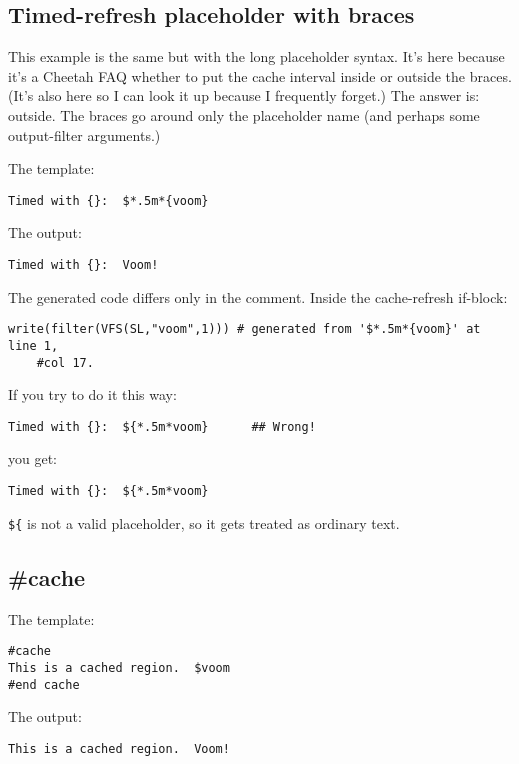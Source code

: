 \subsection{Timed-refresh placeholder with braces}
\label{cache.timed.braces}

This example is the same but with the long placeholder syntax.  It's here 
because it's a Cheetah FAQ whether to put the cache interval inside or outside
the braces.  (It's also here so I can look it up because I frequently forget.)
The answer is: outside.  The braces go around only the placeholder name (and
perhaps some output-filter arguments.)

The template:
\begin{verbatim}
Timed with {}:  $*.5m*{voom}
\end{verbatim}

The output:
\begin{verbatim}
Timed with {}:  Voom!
\end{verbatim}

The generated code differs only in the comment.  Inside the cache-refresh
if-block:
\begin{verbatim}
write(filter(VFS(SL,"voom",1))) # generated from '$*.5m*{voom}' at line 1, 
    #col 17.
\end{verbatim}

If you try to do it this way:
\begin{verbatim}
Timed with {}:  ${*.5m*voom}      ## Wrong!
\end{verbatim}
you get:
\begin{verbatim}
Timed with {}:  ${*.5m*voom}
\end{verbatim}
\verb+${+ is not a valid placeholder, so it gets treated as ordinary text.

\subsection{\#cache}
\label{cache.directive}

The template:
\begin{verbatim}
#cache
This is a cached region.  $voom
#end cache
\end{verbatim}

The output:
\begin{verbatim}
This is a cached region.  Voom!
\end{verbatim}

